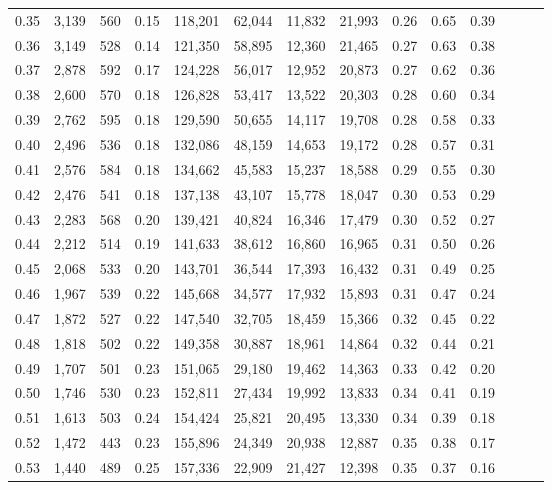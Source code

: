 \begin{tabular}{rrrrrrrrrrrrrr}
0.35 &  3,139 &  560 &  0.15 &  118,201 &   62,044 &  11,832 &  21,993 &  0.26 &  0.65 &      0.39 \\
0.36 &  3,149 &  528 &  0.14 &  121,350 &   58,895 &  12,360 &  21,465 &  0.27 &  0.63 &      0.38 \\
0.37 &  2,878 &  592 &  0.17 &  124,228 &   56,017 &  12,952 &  20,873 &  0.27 &  0.62 &      0.36 \\
0.38 &  2,600 &  570 &  0.18 &  126,828 &   53,417 &  13,522 &  20,303 &  0.28 &  0.60 &      0.34 \\
0.39 &  2,762 &  595 &  0.18 &  129,590 &   50,655 &  14,117 &  19,708 &  0.28 &  0.58 &      0.33 \\
0.40 &  2,496 &  536 &  0.18 &  132,086 &   48,159 &  14,653 &  19,172 &  0.28 &  0.57 &      0.31 \\
0.41 &  2,576 &  584 &  0.18 &  134,662 &   45,583 &  15,237 &  18,588 &  0.29 &  0.55 &      0.30 \\
0.42 &  2,476 &  541 &  0.18 &  137,138 &   43,107 &  15,778 &  18,047 &  0.30 &  0.53 &      0.29 \\
0.43 &  2,283 &  568 &  0.20 &  139,421 &   40,824 &  16,346 &  17,479 &  0.30 &  0.52 &      0.27 \\
0.44 &  2,212 &  514 &  0.19 &  141,633 &   38,612 &  16,860 &  16,965 &  0.31 &  0.50 &      0.26 \\
0.45 &  2,068 &  533 &  0.20 &  143,701 &   36,544 &  17,393 &  16,432 &  0.31 &  0.49 &      0.25 \\
0.46 &  1,967 &  539 &  0.22 &  145,668 &   34,577 &  17,932 &  15,893 &  0.31 &  0.47 &      0.24 \\
0.47 &  1,872 &  527 &  0.22 &  147,540 &   32,705 &  18,459 &  15,366 &  0.32 &  0.45 &      0.22 \\
0.48 &  1,818 &  502 &  0.22 &  149,358 &   30,887 &  18,961 &  14,864 &  0.32 &  0.44 &      0.21 \\
0.49 &  1,707 &  501 &  0.23 &  151,065 &   29,180 &  19,462 &  14,363 &  0.33 &  0.42 &      0.20 \\
0.50 &  1,746 &  530 &  0.23 &  152,811 &   27,434 &  19,992 &  13,833 &  0.34 &  0.41 &      0.19 \\
0.51 &  1,613 &  503 &  0.24 &  154,424 &   25,821 &  20,495 &  13,330 &  0.34 &  0.39 &      0.18 \\
0.52 &  1,472 &  443 &  0.23 &  155,896 &   24,349 &  20,938 &  12,887 &  0.35 &  0.38 &      0.17 \\
0.53 &  1,440 &  489 &  0.25 &  157,336 &   22,909 &  21,427 &  12,398 &  0.35 &  0.37 &      0.16 \\

\end{tabular}
